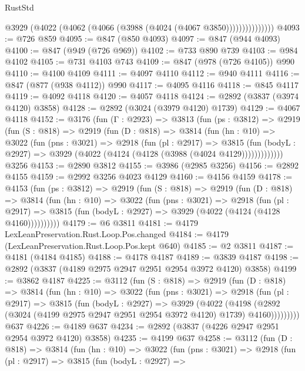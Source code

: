 \begin{lexlean}{RustStd}
\begin{coremodule}
                    @3929 (@4022 (@4062 (@4066 (@3988 (@4024 (@4067 @3850)))))))))))))))
@4093 := @726 @859
@4095 := @847 (@850 @4093)
@4097 := @847 (@944 @4093)
@4100 := @847 (@949 (@726 @969))
@4102 := @733 @890 @739
@4103 := @984 @4102
@4105 := @731 @4103 @743
@4109 := @847 (@978 (@726 @4105)) @990
@4110 := @4100 @4109
@4111 := @4097 @4110
@4112 := @940 @4111
@4116 := @847 (@877 (@938 @4112)) @990
@4117 := @4095 @4116
@4118 := @845 @4117
@4119 := @4092 @4118
@4120 := @4057 @4118
@4124 := @2892 (@3837 (@3974 @4120) @3858)
@4128 := @2892 (@3024 (@3979 @4120) @1739)
@4129 := @4067 @4118
@4152 := @3176
    (fun (Γ : @2923) =>
    @3813
      (fun (ps : @3812) =>
      @2919
        (fun (S : @818) =>
        @2919
          (fun (D : @818) =>
          @3814
            (fun (hn : @10) =>
            @3022
              (fun (pns : @3021) =>
              @2918
                (fun (pl : @2917) =>
                @3815
                  (fun (bodyL : @2927) =>
                  @3929 (@4022 (@4124 (@4128 (@3988 (@4024 @4129)))))))))))))
    @3256
@4153 := @2890 @3812
@4155 := @3986 (@2985 @3256)
@4156 := @2892 @4155
@4159 := @2992 @3256 @4023 @4129
@4160 := @4156 @4159
@4178 := @4153
    (fun (ps : @3812) =>
    @2919
      (fun (S : @818) =>
      @2919
        (fun (D : @818) =>
        @3814
          (fun (hn : @10) =>
          @3022
            (fun (pns : @3021) =>
            @2918
              (fun (pl : @2917) =>
              @3815 (fun (bodyL : @2927) => @3929 (@4022 (@4124 (@4128 @4160))))))))))
@4179 := @6 @3811
@4181 := @4179 LexLeanPreservation.Rust.Loop.Pos.changed
@4184 := @4179 (LexLeanPreservation.Rust.Loop.Pos.kept @640)
@4185 := @2 @3811
@4187 := @4181 (@4184 @4185)
@4188 := @4178 @4187
@4189 := @3839 @4187
@4198 := @2892 (@3837 (@4189 @2975 @2947 @2951 @2954 @3972 @4120) @3858)
@4199 := @3862 @4187
@4225 := @3112
    (fun (S : @818) =>
    @2919
      (fun (D : @818) =>
      @3814
        (fun (hn : @10) =>
        @3022
          (fun (pns : @3021) =>
          @2918
            (fun (pl : @2917) =>
            @3815
              (fun (bodyL : @2927) =>
              @3929
                (@4022
                  (@4198
                    (@2892 (@3024 (@4199 @2975 @2947 @2951 @2954 @3972 @4120) @1739) @4160)))))))))
    @637
@4226 := @4189 @637
@4234 := @2892 (@3837 (@4226 @2947 @2951 @2954 @3972 @4120) @3858)
@4235 := @4199 @637
@4258 := @3112
    (fun (D : @818) =>
    @3814
      (fun (hn : @10) =>
      @3022
        (fun (pns : @3021) =>
        @2918
          (fun (pl : @2917) =>
          @3815
            (fun (bodyL : @2927) =>

\end{coremodule}
\end{lexlean}
